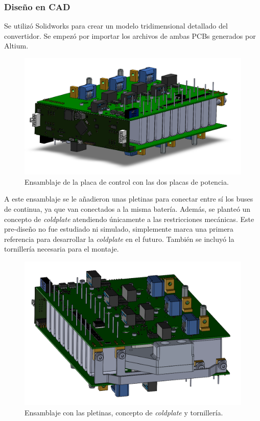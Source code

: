 \subsubsection{Diseño en CAD}

Se utilizó Solidworks para crear un modelo tridimensional detallado del convertidor. Se empezó por importar los archivos de ambas PCBs generados por Altium.

\begin{figure}[H]
	\centering
	\includegraphics[width=0.7\linewidth]{fig/assembly1}
	\caption{Ensamblaje de la placa de control con las dos placas de potencia.}
\end{figure}

A este ensamblaje se le añadieron unas pletinas para conectar entre sí los buses de continua, ya que van conectados a la misma batería. Además, se planteó un concepto de \textit{coldplate} atendiendo únicamente a las restricciones mecánicas. Este pre-diseño no fue estudiado ni simulado, simplemente marca una primera referencia para desarrollar la \textit{coldplate} en el futuro. También se incluyó la tornillería necesaria para el montaje.

\begin{figure}[H]
	\centering
	\includegraphics[width=0.7\linewidth]{fig/assembly2}
	\caption{Ensamblaje con las pletinas, concepto de \textit{coldplate} y tornillería.}
\end{figure}

